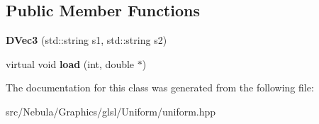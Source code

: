 \subsection*{\-Public \-Member \-Functions}
\begin{DoxyCompactItemize}
\item 
\hypertarget{classNeb_1_1glsl_1_1Uniform_1_1Vector_1_1DVec3_a0eafe586b49fbf3f40483014ee8ab93d}{{\bfseries \-D\-Vec3} (std\-::string s1, std\-::string s2)}\label{classNeb_1_1glsl_1_1Uniform_1_1Vector_1_1DVec3_a0eafe586b49fbf3f40483014ee8ab93d}

\item 
\hypertarget{classNeb_1_1glsl_1_1Uniform_1_1Vector_1_1DVec3_a259ae2290abc4445a5c661d2547597b5}{virtual void {\bfseries load} (int, double $\ast$)}\label{classNeb_1_1glsl_1_1Uniform_1_1Vector_1_1DVec3_a259ae2290abc4445a5c661d2547597b5}

\end{DoxyCompactItemize}


\-The documentation for this class was generated from the following file\-:\begin{DoxyCompactItemize}
\item 
src/\-Nebula/\-Graphics/glsl/\-Uniform/uniform.\-hpp\end{DoxyCompactItemize}
